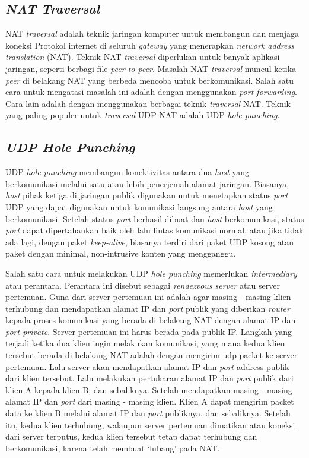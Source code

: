 \nocite{liu2021whatisnat}
\nocite{rosenberg2003stun}

\subsection{\emph{NAT Traversal}}

NAT \emph{traversal} adalah teknik jaringan komputer untuk membangun dan menjaga koneksi Protokol internet di seluruh \emph{gateway} yang menerapkan \emph{network address translation} (NAT). Teknik NAT \emph{traversal} diperlukan untuk banyak aplikasi jaringan, seperti berbagi file \emph{peer-to-peer}. Masalah NAT \emph{traversal} muncul ketika \emph{peer} di belakang NAT yang berbeda mencoba untuk berkomunikasi. Salah satu cara untuk mengatasi masalah ini adalah dengan menggunakan \emph{port forwarding}. Cara lain adalah dengan menggunakan berbagai teknik \emph{traversal} NAT. Teknik yang paling populer untuk \emph{traversal} UDP NAT adalah UDP \emph{hole punching}.

\subsection{\emph{UDP Hole Punching}}

UDP \emph{hole punching} membangun konektivitas antara dua \emph{host} yang berkomunikasi melalui satu atau lebih penerjemah alamat jaringan. Biasanya, \emph{host} pihak ketiga di jaringan publik digunakan untuk menetapkan status \emph{port} UDP yang dapat digunakan untuk komunikasi langsung antara \emph{host} yang berkomunikasi. Setelah status \emph{port} berhasil dibuat dan \emph{host} berkomunikasi, status \emph{port} dapat dipertahankan baik oleh lalu lintas komunikasi normal, atau jika tidak ada lagi, dengan paket \emph{keep-alive}, biasanya terdiri dari paket UDP kosong atau paket dengan minimal, non-intrusive konten yang mengganggu.

Salah satu cara untuk melakukan UDP \emph{hole punching} memerlukan \emph{intermediary} atau perantara. Perantara ini disebut sebagai \emph{rendezvous server} atau server pertemuan. Guna dari server pertemuan ini adalah agar masing - masing klien terhubung dan mendapatkan alamat IP dan \emph{port} publik yang diberikan \emph{router} kepada proses komunikasi yang berada di belakang NAT dengan alamat IP dan \emph{port private}. Server pertemuan ini harus berada pada publik IP. Langkah yang terjadi ketika dua klien ingin melakukan komunikasi, yang mana kedua klien tersebut berada di belakang NAT adalah dengan mengirim udp packet ke server pertemuan. Lalu server akan mendapatkan alamat IP dan \emph{port} address publik dari klien tersebut. Lalu melakukan pertukaran alamat IP dan \emph{port} publik dari klien A kepada klien B, dan sebaliknya. Setelah mendapatkan masing - masing alamat IP dan \emph{port} dari masing - masing klien. Klien A dapat mengirim packet data ke klien B melalui alamat IP dan \emph{port} publiknya, dan sebaliknya. Setelah itu, kedua klien terhubung, walaupun server pertemuan dimatikan atau koneksi dari server terputus, kedua klien tersebut tetap dapat terhubung dan berkomunikasi, karena telah membuat `lubang' pada NAT.

